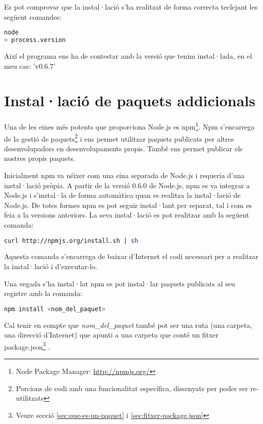 Es pot comprovar que la instal·lació s'ha realitzat de forma correcta teclejant les següent comandes: 

\begin{lstlisting}[language=bash]
node
> process.version
\end{lstlisting}

Així el programa ens ha de contestar amb la versió que tenim instal·lada, en el meu cas: 'v0.6.7'

\section{Instal·lació de paquets addicionals}
\label{sec:paquets-adicionals}
Una de les eines més potents que proporciona Node.js es npm\footnote{Node Package Manager: \url{http://npmjs.org/}}.
Npm s'encarrega de la gestió de paquets\footnote{Porcions de codi amb una funcionalitat específica, dissenyats per poder ser re-utilitzats} i ens permet utilitzar paquets publicats per altres desenvolupadors en desenvolupaments propis. També ens permet publicar els nostres propis paquets. 

Inicialment npm va néixer com una eina separada de Node.js i requeria d'una instal·lació pròpia. A partir de la versió 0.6.0 de Node.js, npm es va integrar a Node.js i s'instal·la de forma automàtica quan es realitza la instal·lació de Node.js. De totes formes npm es pot seguir instal·lant per separat, tal i com es feia a la versions anteriors. La seva instal·lació es pot realitzar amb la següent comanda:

\begin{lstlisting}[language=bash]
curl http://npmjs.org/install.sh | sh
\end{lstlisting}

Aquesta comanda s'encarrega de baixar d'Internet el codi necessari per a realitzar la instal·lació i d'executar-lo. 

Una vegada s'ha instal·lat npm es pot instal·lar paquets publicats al seu registre amb la comanda:

\begin{lstlisting}[language=bash]
npm install <nom_del_paquet>
\end{lstlisting}

Cal tenir en compte que \emph{nom\_del\_paquet} també pot ser una ruta (una carpeta, una direcció d'Internet) que apunti a una carpeta que conté un fitxer package.json\footnote{Veure secció \ref{sec:que-es-un-paquet} i \ref{sec:fitxer-package.json}} . 

